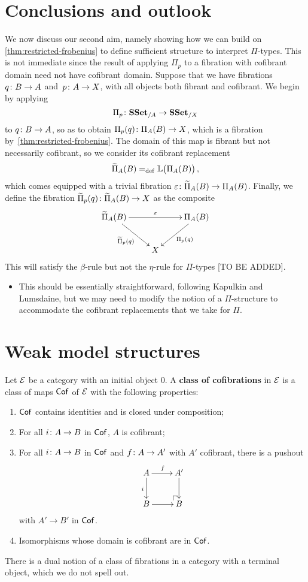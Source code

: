 \documentclass[reqno,10pt,a4paper,oneside,draft]{amsart}
\begin{document}
\newpage

\section{Conclusions and outlook}
\label{sec:conout}

We now discuss our second aim, namely showing how we can build on \cref{thm:restricted-frobenius} 
to define sufficient structure to interpret $\Pi$-types. This is not immediate since the result of applying $\Pi_p$ to a 
fibration with cofibrant domain need not have cofibrant domain.
 Suppose that we have fibrations 
$q \co B \to A$ and~$p \co A \to X$, with
all objects both fibrant and cofibrant. 
We begin by applying 
\[
\Pi_p  \co \SSet_{/A} \to \SSet_{/X}
\]
to $q \co B \to A$, so as to obtain $\Pi_p(q) \co \Pi_A(B) \to X$, which is
a fibration by~\cref{thm:restricted-frobenius}. The domain of this map is fibrant but
not necessarily cofibrant, so we consider its cofibrant replacement 
\[
\widetilde{\Pi}_A(B) \defeq \mathbb{L} \big( \Pi_A(B)  \big) \, ,
\]
which comes equipped with a trivial fibration $\varepsilon \co \widetilde{\Pi}_A(B) \to \Pi_A(B)$.
Finally, we define the fibration $\widetilde{\Pi}_p(q) \co \widetilde{\Pi}_A(B) \to X$ as 
 the composite
 \[
\xymatrix{
\widetilde{\Pi}_A(B) \ar[rr]^{\varepsilon} \ar[dr]_{\widetilde{\Pi}_p(q) } & & \Pi_A(B) \ar[dl]^{\Pi_p(q)}  \\
 & X &} 
 \]
This will satisfy the $\beta$-rule but not the $\eta$-rule for $\Pi$-types [TO BE ADDED].




\begin{itemize}
\item This should be essentially straightforward, following Kapulkin and Lumsdaine, but we may need to modify the notion of a $\Pi$-structure to accommodate the cofibrant replacements that we take for $\Pi$.
\end{itemize}

\appendix

\section{Weak model structures} 

Let $\cal{E}$ be a category with an initial object $0$. A {\bf class of cofibrations} in $\cal{E}$ is
a class of maps $\Cof$ of $\cal{E}$ with the following properties:
\begin{enumerate}[(C1)]
\item $\Cof$ contains identities and is closed under composition;
\item For all $i \co A \to B$ in $\Cof$, $A$ is cofibrant;
\item For all $i \co A \to B$ in $\Cof$ and $f \co A \to A'$ with $A'$ cofibrant, there is a pushout
\[
\xymatrix{
A \ar[r]^f \ar[d]_{i}  & A' \ar[d] \\
B \ar[r] & \ulpullback B }
\]
with $A' \to B'$ in $\Cof$.
\item Isomorphisms whose domain is cofibrant are in $\Cof$.
\end{enumerate}
There is a dual notion of a class of fibrations in a category with a terminal object, which we do
not spell out.
\end{document}
